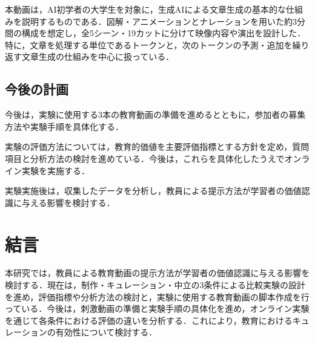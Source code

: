 \documentclass[11pt]{ltjarticle}
\begin{document}
本動画は，AI初学者の大学生を対象に，生成AIによる文章生成の基本的な仕組みを説明するものである．図解・アニメーションとナレーションを用いた約3分間の構成を想定し，全5シーン・19カットに分けて映像内容や演出を設計した．特に，文章を処理する単位であるトークンと，次のトークンの予測・追加を繰り返す文章生成の仕組みを中心に扱っている．

\subsection{今後の計画}

今後は，実験に使用する3本の教育動画の準備を進めるとともに，参加者の募集方法や実験手順を具体化する．

実験の評価方法については，教育的価値を主要評価指標とする方針を定め，質問項目と分析方法の検討を進めている．今後は，これらを具体化したうえでオンライン実験を実施する．

実験実施後は，収集したデータを分析し，教員による提示方法が学習者の価値認識に与える影響を検討する．

\section{結言}

本研究では，教員による教育動画の提示方法が学習者の価値認識に与える影響を検討する．現在は，制作・キュレーション・中立の3条件による比較実験の設計を進め，評価指標や分析方法の検討と，実験に使用する教育動画の脚本作成を行っている．今後は，刺激動画の準備と実験手順の具体化を進め，オンライン実験を通じて各条件における評価の違いを分析する．これにより，教育におけるキュレーションの有効性について検討する．
\end{document}
